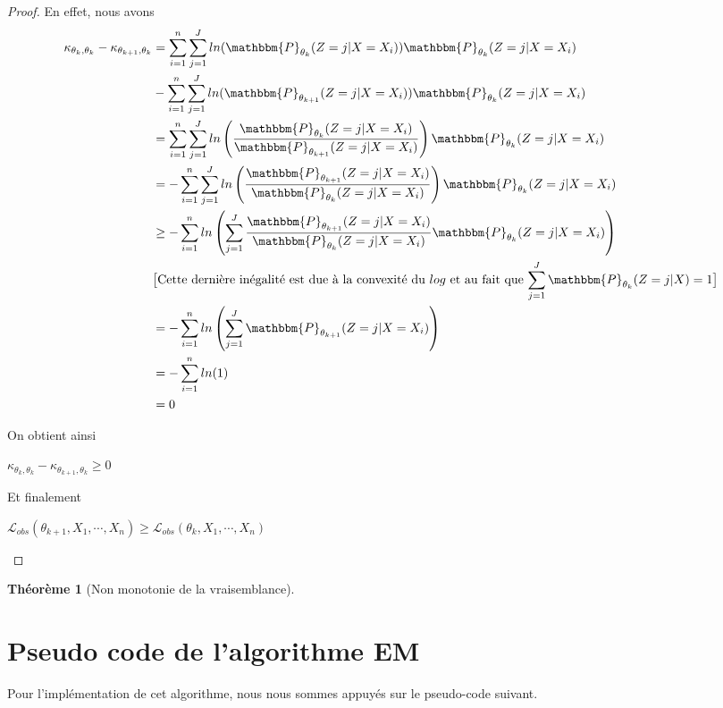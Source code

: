 \documentclass[frenchb]{report}
\newcommand{\1}{\mathbbm{1}}
\newcommand{\prob}{\mathbbm{P}}
\newcommand{\lv}{\mathcal{L}}
\newtheorem{thm}{Théorème}
\theoremstyle{definition}\newtheorem{defn}{Définition}
\theoremstyle{definition}\newtheorem{exm}{Exemple}
\theoremstyle{definition}\newtheorem{nota}{Notation}
\theoremstyle{definition}\newtheorem{rem}{Remarque}
\begin{document}
\begin{proof}
En effet, nous avons
\begin{align*}
\kappa_{\theta_{k}, \theta_k}-\kappa_{\theta_{k+1}, \theta_k} &= \sum_{i=1}^n\sum_{j=1}^J ln(\prob_{\theta_k}(Z = j|X=X_i))\prob_{\theta_k}(Z = j|X = X_i) \\
&- \sum_{i=1}^n \sum_{j=1}^J ln(\prob_{\theta_{k+1}}(Z = j|X=X_i))\prob_{\theta_k}(Z = j|X = X_i) \\
&= \sum_{i=1}^n \sum_{j=1}^J ln\left(\frac{\prob_{\theta_k}(Z = j|X=X_i)}{\prob_{\theta_{k+1}}(Z = j|X=X_i)}\right)\prob_{\theta_k}(Z = j|X = X_i)\\
&= - \sum_{i=1}^n \sum_{j=1}^J ln\left(\frac{\prob_{\theta_{k+1}}(Z = j|X=X_i)}{\prob_{\theta_k}(Z = j|X=X_i)}\right)\prob_{\theta_k}(Z = j|X = X_i)\\
&\geq - \sum_{i=1}^n ln\left(\sum_{j=1}^J \frac{\prob_{\theta_{k+1}}(Z = j|X=X_i)}{\prob_{\theta_k}(Z = j|X=X_i)}\prob_{\theta_k}(Z = j|X = X_i) \right)\\
&\text{$\big[$Cette dernière inégalité est due à la convexité du $log$ et au fait que $\displaystyle\sum_{j=1}^J\prob_{\theta_k}(Z = j|X)=1\big]$}\\
&= - \sum_{i=1}^n ln\left(\sum_{j=1}^J\prob_{\theta_{k+1}}(Z = j|X=X_i)\right)\\
&=  - \sum_{i=1}^n ln(1)\\
&= 0
\end{align*}


On obtient ainsi

\begin{center} $\kappa_{\theta_{k}, \theta_k}-\kappa_{\theta_{k+1}, \theta_k} \geq 0$ \end{center}


Et finalement
\begin{center} $\lv_{obs}(\theta_{k+1}, X_1, \cdots, X_n) \geq \lv_{obs}(\theta_k, X_1, \cdots, X_n)$ \end{center}

\end{proof}


\begin{thm}[Non monotonie de la vraisemblance]

\end{thm}

\section{Pseudo code de l'algorithme EM}
Pour l'implémentation de cet algorithme, nous nous sommes appuyés sur le pseudo-code suivant.
\end{document}
